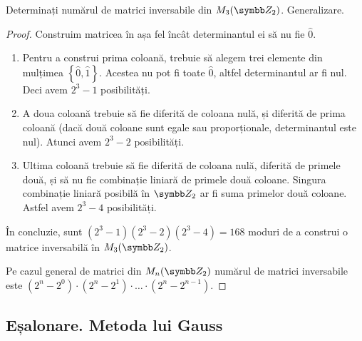 \begin{exercise}[185]
Determinați numărul de matrici inversabile din \(\matrices{3}{\integersmod{2}}\). Generalizare.
\end{exercise}
\begin{proof}
Construim matricea în așa fel încât determinantul ei să nu fie \(\widehat{0}\).
\begin{enumerate}
    \item Pentru a construi prima coloană, trebuie să alegem trei elemente din mulțimea \(\left\lbrace \widehat{0}, \widehat{1} \right\rbrace\). Acestea nu pot fi toate \(\widehat{0}\), altfel determinantul ar fi nul. Deci avem \(2^3 - 1\) posibilități.
    
    \item A doua coloană trebuie să fie diferită de coloana nulă, și diferită de prima coloană (dacă două coloane sunt egale sau proporționale, determinantul este nul). Atunci avem \(2^3 - 2\) posibilități.
    
    \item Ultima coloană trebuie să fie diferită de coloana nulă, diferită de primele două, și să nu fie combinație liniară de primele două coloane. Singura combinație liniară posibilă în \(\integersmod{2}\) ar fi suma primelor două coloane. Astfel avem \(2^3 - 4\) posibilități.
\end{enumerate}
În concluzie, sunt \((2^3 - 1)(2^3 - 2)(2^3 - 4) = 168\) moduri de a construi o matrice inversabilă în \(\matrices{3}{\integersmod{2}}\).

Pe cazul general de matrici din \(\matrices{n}{\integersmod{2}}\) numărul de matrici inversabile este
\((2^n - 2^0) \cdot (2^n - 2^1) \cdot \dots \cdot (2^n - 2^{n - 1})\).
\end{proof}

\subsection{Eșalonare. Metoda lui Gauss}

